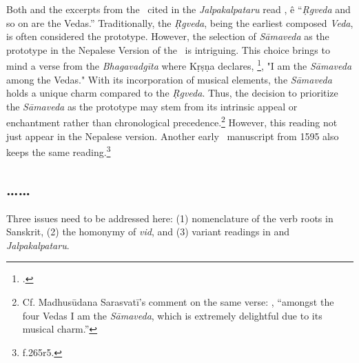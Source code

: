 Both \SuComma{}{} and the excerpts from the \SS\ cited in the \emph{Jalpakalpataru} read , ê
“\emph{Ṛgveda} and so on are the Vedas.” 
 Traditionally, the \emph{Ṛgveda}, being the earliest composed \emph{Veda}, 
is often considered the prototype. 
However, the selection of \emph{Sāmaveda} as the prototype in the Nepalese Version of the \SS\ is intriguing. 
This choice brings to mind a verse from the \emph{Bhagavadgīta} where Kṛṣṇa declares, 
\footcite[10.22][456]{pans-1936}, 
"I am the \emph{Sāmaveda} among the Vedas." 
With its incorporation of musical elements, 
the \emph{Sāmaveda} holds a unique charm compared to the \emph{Ṛgveda}. 
Thus, the decision to prioritize the \emph{Sāmaveda} as the prototype 
	may stem from its intrinsic appeal or enchantment rather than chronological precedence.\footnote{
	Cf. Madhusūdana Sarasvatī's comment on the same verse: 
	\parencite[10.22][456]{pans-1936}, 
	“amongst the four Vedas I am the \emph{Sāmaveda}, which is extremely delightful due to its musical charm.”}
However, this reading not just appear in the Nepalese version. 
Another early \SS\ manuscript from 1595 also keeps the same reading.\footnote{ f.265r5.}
	 
\subsection{\ldots{}\ldots}
	 
Three issues need to be addressed here: 
	(1) nomenclature of the verb roots in Sanskrit, 
	(2) the homonymy of \emph{vid}, and 
	(3) variant readings in \SuComma{}{} and \emph{Jalpakalpataru}. 
	 		
